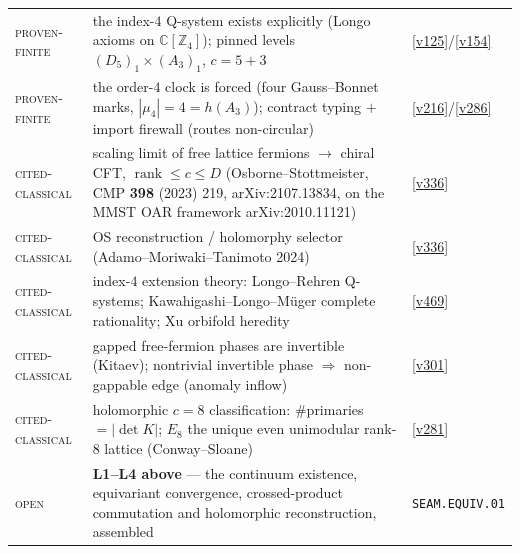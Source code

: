 \documentclass[11pt,a4paper]{article}
\newcommand{\Z}{\mathbb Z}
\begin{document}
\begin{center}
\begin{tabularx}{\linewidth}{@{}l>{\hsize=1.45\hsize\raggedright\arraybackslash}X>{\hsize=0.55\hsize\raggedright\arraybackslash}X@{}}
\textsc{proven-finite} & the index-$4$ Q-system exists explicitly (Longo axioms on $\mathbb C[\Z_4]$); pinned levels $(D_5)_1\times(A_3)_1$, $c=5+3$ & \vref{v125}/\vref{v154} \\
\textsc{proven-finite} & the order-$4$ clock is forced (four Gauss--Bonnet marks, $|\mu_4|=4=h(A_3)$); contract typing $+$ import firewall (routes non-circular) & \vref{v216}/\vref{v286} \\
\textsc{cited-classical} & scaling limit of free lattice fermions $\to$ chiral CFT, $\operatorname{rank}\le c\le D$ (Osborne--Stottmeister, CMP \textbf{398} (2023) 219, arXiv:2107.13834, on the MMST OAR framework arXiv:2010.11121) & \vref{v336} \\
\textsc{cited-classical} & OS reconstruction / holomorphy selector (Adamo--Moriwaki--Tanimoto 2024) & \vref{v336} \\
\textsc{cited-classical} & index-$4$ extension theory: Longo--Rehren Q-systems; Kawahigashi--Longo--M\"uger complete rationality; Xu orbifold heredity & \vref{v469} \\
\textsc{cited-classical} & gapped free-fermion phases are invertible (Kitaev); nontrivial invertible phase $\Rightarrow$ non-gappable edge (anomaly inflow) & \vref{v301} \\
\textsc{cited-classical} & holomorphic $c=8$ classification: $\#$primaries $=|\det K|$; $E_8$ the unique even unimodular rank-$8$ lattice (Conway--Sloane) & \vref{v281} \\
\textsc{open} & \textbf{L1--L4 above} --- the continuum existence, equivariant convergence, crossed-product commutation and holomorphic reconstruction, assembled & \texttt{SEAM.EQUIV.01} \\
\bottomrule
\end{tabularx}
\end{center}
\end{document}
